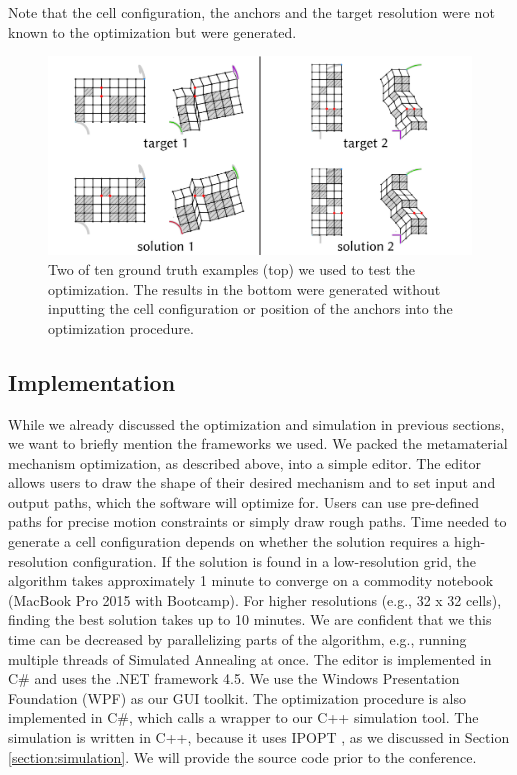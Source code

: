 Note that the cell configuration, the anchors and the target resolution were not known to the optimization but were generated.

\begin{figure} [h]
    \includegraphics[width=\textwidth]{chapters/understanding-metamaterial-mechanisms-FIG/15-groundtruth-test.png}
    \caption[Short figure name.]{Two of ten ground truth examples (top) we used to test the optimization. The results in the bottom were generated without inputting the cell configuration or position of the anchors into the optimization procedure.
    \label{fig:15-groundtruth-test}}
\end{figure}


\subsection{Implementation}

While we already discussed the optimization and simulation in previous sections, we want to briefly mention the frameworks we used. We packed the metamaterial mechanism optimization, as described above, into a simple editor. The editor allows users to draw the shape of their desired mechanism and to set input and output paths, which the software will optimize for. Users can use pre-defined paths for precise motion constraints or simply draw rough paths. Time needed to generate a cell configuration depends on whether the solution requires a high-resolution configuration. If the solution is found in a low-resolution grid, the algorithm takes approximately 1 minute to converge on a commodity notebook (MacBook Pro 2015 with Bootcamp). For higher resolutions (e.g., 32 x 32 cells), finding the best solution takes up to 10 minutes. We are confident that we this time can be decreased by parallelizing parts of the algorithm, e.g., running multiple threads of Simulated Annealing at once. The editor is implemented in C\# and uses the .NET framework 4.5. We use the Windows Presentation Foundation (WPF) as our GUI toolkit. The optimization procedure is also implemented in C\#, which calls a wrapper to our C++ simulation tool. The simulation is written in C++, because it uses IPOPT \todo{[46]}, as we discussed in Section \ref{section:simulation}. We will provide the source code prior to the conference.

